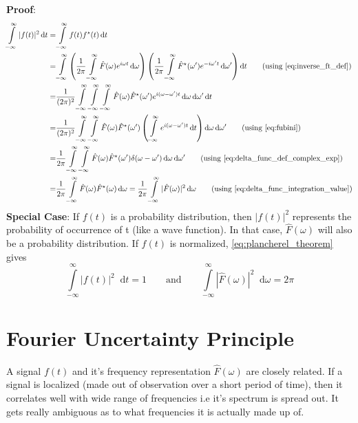 \documentclass[11pt, a4paper]{article}
\let\oldsection\section
\renewcommand{\section}{%
	\setcounter{equation}{0}%
	\oldsection%
}
\newcommand{\eqrefnp}[1]{\textup{\ref{#1}}}
\newcommand{\primed}[1]{#1^{\prime}}
\newcommand{\omegap}{\primed{\omega}}	%
\newcommand{\diff}{\mathop{}\!\mathrm{d}}
\newcommand{\dt}{\diff t}
\newcommand{\domega}{\diff \omega}
\newcommand{\domegap}{\diff \omegap}
\newcommand{\dint}[2]{\int \limits_{#1}^{#2}}  %
\newcommand{\intinfty}{\dint{-\infty}{\infty}}	%
\newcommand{\iintinfty}{\intinfty \intinfty}	%
\newcommand{\iiintinfty}{\intinfty \intinfty \intinfty}	%
\begin{document}
\vspace{4pt}
\noindent
\textbf{Proof}: 
\begin{align*}
	\intinfty |f(t)|^{2} \dt 
	= & \intinfty f(t)f^{\star}(t) \dt \\
	= & \intinfty \left(\frac{1}{2 \pi} \intinfty \hat{F}(\omega) e^{i \omega t} \domega \right) \left(\frac{1}{2 \pi} \intinfty \hat{F}^{\star}(\omegap) e^{-i \omegap t} \domegap \right) \dt \tag{using \eqrefnp{eq:inverse_ft_def}} \\
	= & \frac{1}{(2 \pi)^2} \iiintinfty \hat{F}(\omega) \hat{F}^{\star}(\omegap) e^{i (\omega - \omegap) t} \domega \domegap \dt \\
	= & \frac{1}{(2 \pi)^2} \iintinfty \hat{F}(\omega) \hat{F}^{\star}(\omegap) \left( \intinfty e^{i (\omega - \omegap) t} \dt \right) \domega \domegap \tag{using \eqrefnp{eq:fubini}} \\
	= & \frac{1}{2 \pi} \iintinfty \hat{F}(\omega) \hat{F}^{\star}(\omegap) \delta(\omega - \omegap) \domega \domegap \tag{using \eqrefnp{eq:delta_func_def_complex_exp}} \\
	= & \frac{1}{2 \pi} \intinfty \hat{F}(\omega) \hat{F}^{\star}(\omega) \domega 
	= \frac{1}{2 \pi} \intinfty |\hat{F}(\omega)|^{2} \domega  \tag{using \eqrefnp{eq:delta_func_integration_value}} \\
\end{align*}
\noindent
\textbf{Special Case}: If $f(t)$ is a probability distribution, then $|f(t)|^{2}$ represents the probability of occurrence of t (like a wave function). In that case, $\hat{F}(\omega)$ will also be a probability distribution. If $f(t)$ is normalized, \eqref{eq:plancherel_theorem} gives
\begin{equation}\label{eq:plancherel_normal_func_and_spectrum}
	\intinfty |f(t)|^{2} \dt = 1 \qquad \text{and} \qquad \intinfty |\hat{F}(\omega)|^{2} \domega = 2 \pi
\end{equation}

\section{Fourier Uncertainty Principle}\label{sec:fourier_uncertainity_principle}
A signal $f(t)$ and it's frequency representation $\hat{F}(\omega)$ are closely related. If a signal is localized (made out of observation over a short period of time), then it correlates well with wide range of frequencies i.e it's spectrum is spread out. It gets really ambiguous as to what frequencies it is actually made up of.
\end{document}
